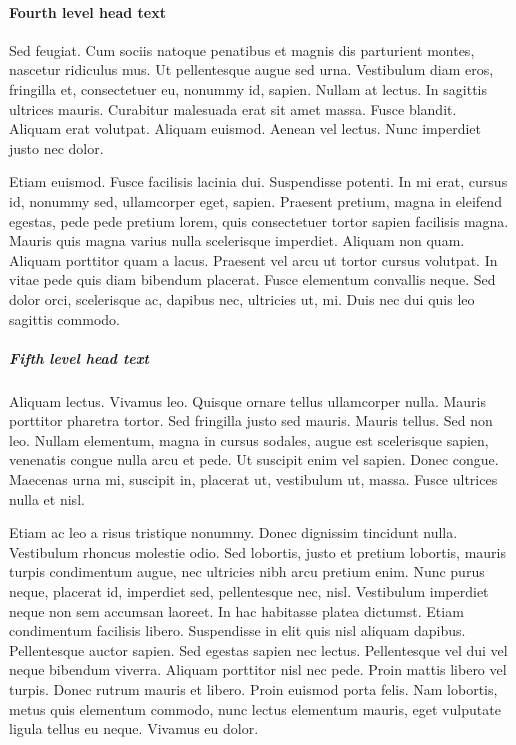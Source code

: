 \documentclass[APA,LATO1COL]{WileyNJD-v2}
\begin{document}
\paragraph{Fourth level head text}

Sed feugiat. Cum sociis natoque penatibus et magnis dis parturient montes, nascetur ridiculus mus. Ut pellentesque
augue sed urna. Vestibulum diam eros, fringilla et, consectetuer eu, nonummy id, sapien. Nullam at lectus. In sagittis
ultrices mauris. Curabitur malesuada erat sit amet massa. Fusce blandit. Aliquam erat volutpat. Aliquam euismod.
Aenean vel lectus. Nunc imperdiet justo nec dolor.

Etiam euismod. Fusce facilisis lacinia dui. Suspendisse potenti. In mi erat, cursus id, nonummy sed, ullamcorper
eget, sapien. Praesent pretium, magna in eleifend egestas, pede pede pretium lorem, quis consectetuer tortor sapien
facilisis magna. Mauris quis magna varius nulla scelerisque imperdiet. Aliquam non quam. Aliquam porttitor quam
a lacus. Praesent vel arcu ut tortor cursus volutpat. In vitae pede quis diam bibendum placerat. Fusce elementum
convallis neque. Sed dolor orci, scelerisque ac, dapibus nec, ultricies ut, mi. Duis nec dui quis leo sagittis commodo.

\subparagraph{Fifth level head text}

Aliquam lectus. Vivamus leo. Quisque ornare tellus ullamcorper nulla. Mauris porttitor pharetra
tortor. Sed fringilla justo sed mauris. Mauris tellus. Sed non leo. Nullam elementum, magna in cursus sodales, augue
est scelerisque sapien, venenatis congue nulla arcu et pede. Ut suscipit enim vel sapien. Donec congue. Maecenas
urna mi, suscipit in, placerat ut, vestibulum ut, massa. Fusce ultrices nulla et nisl.

Etiam ac leo a risus tristique nonummy. Donec dignissim tincidunt nulla. Vestibulum rhoncus molestie odio. Sed
lobortis, justo et pretium lobortis, mauris turpis condimentum augue, nec ultricies nibh arcu pretium enim. Nunc
purus neque, placerat id, imperdiet sed, pellentesque nec, nisl. Vestibulum imperdiet neque non sem accumsan laoreet.
In hac habitasse platea dictumst. Etiam condimentum facilisis libero. Suspendisse in elit quis nisl aliquam dapibus.
Pellentesque auctor sapien. Sed egestas sapien nec lectus. Pellentesque vel dui vel neque bibendum viverra. Aliquam
porttitor nisl nec pede. Proin mattis libero vel turpis. Donec rutrum mauris et libero. Proin euismod porta felis.
Nam lobortis, metus quis elementum commodo, nunc lectus elementum mauris, eget vulputate ligula tellus eu neque.
Vivamus eu dolor.
\end{document}
